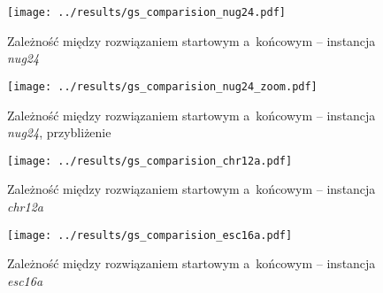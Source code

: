 \documentclass{article}
\begin{document}
			\begin{figure}[h]
				\texttt{[image: ../results/gs\_comparision\_nug24.pdf]}
				\caption{Zależność między rozwiązaniem startowym a~końcowym -- instancja \emph{nug24}\label{fig:gs.nug24}}				
			\end{figure}
			
			\begin{figure}[h]
				\texttt{[image: ../results/gs\_comparision\_nug24\_zoom.pdf]}
				\caption{Zależność między rozwiązaniem startowym a~końcowym -- instancja \emph{nug24}\label{fig:gs.nug24_zoom}, przybliżenie}				
			\end{figure}
			
			\begin{figure}[h]
				\texttt{[image: ../results/gs\_comparision\_chr12a.pdf]}
				\caption{Zależność między rozwiązaniem startowym a~końcowym -- instancja \emph{chr12a}\label{fig:gs.chr12a}}				
			\end{figure}
			
			\begin{figure}[h]
				\texttt{[image: ../results/gs\_comparision\_esc16a.pdf]}
				\caption{Zależność między rozwiązaniem startowym a~końcowym -- instancja \emph{esc16a}\label{fig:gs.esc16a}}				
			\end{figure}
		
\end{document}
